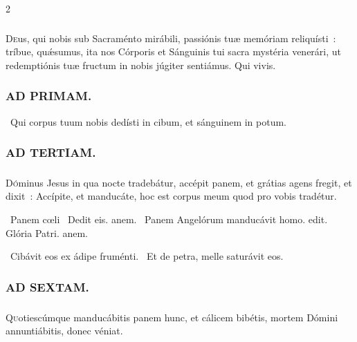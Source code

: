 \documentclass[9pt,twoside]{extarticle}
\begin{document}
\begin{multicols}{2}
\subsubsection*{\center {}}
\lettrine{D}eus, qui nobis sub Sacraménto mirábili, passiónis tuæ memóriam reliquísti~: tríbue, quǽsumus, ita nos Córporis et Sánguinis tui sacra mystéria venerári, ut redemptiónis tuæ fructum in nobis júgiter sentiámus. Qui vivis.

\begin{tightlist}{}
\item {}
\end{tightlist}

\subsubsection*{\center \textsc{AD PRIMAM.}}
\noindent {}~Qui corpus tuum nobis dedísti in cibum, et sánguinem in potum.

\subsubsection*{\center \textsc{AD TERTIAM.}}
\subsubsection*{}
\lettrine{D}óminus Jesus in qua nocte tradebátur, accépit panem, et grátias agens fregit, et dixit~: Accípite, et manducáte, hoc est corpus meum quod pro vobis tradétur.

\begin{tightlist}{}
\item {}~Panem cœli \textred{*}~Dedit eis. anem. ~Panem Angelórum manducávit homo. edit. Glória Patri. anem.
\item {}~Cibávit eos ex ádipe fruménti. ~Et de petra, melle saturávit eos.
\end{tightlist}

\subsubsection*{\center \textsc{AD SEXTAM.}}
\subsubsection*{}
\lettrine{Q}uotiescúmque manducábitis panem hunc, et cálicem bibétis, mortem Dómini annuntiábitis, donec véniat. 


\end{multicols}
\end{document}
